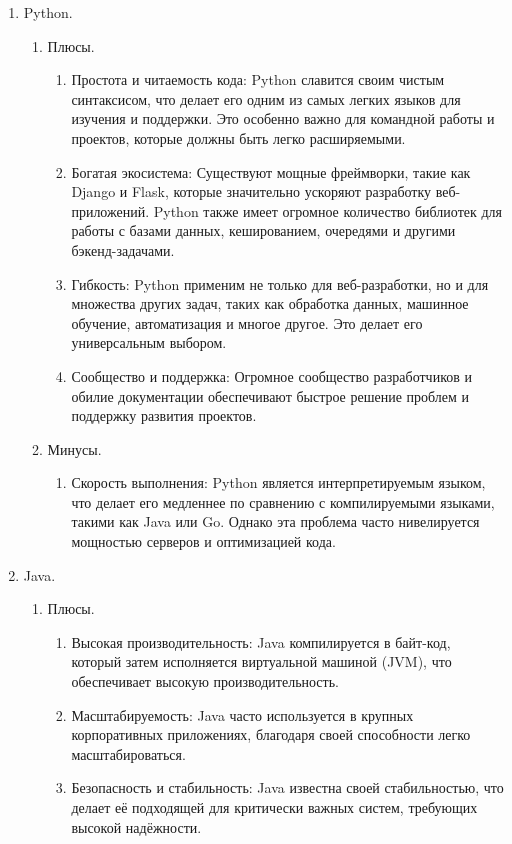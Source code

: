 \begin{enumerate}
	\item Python.
	\begin{enumerate}
		\item Плюсы.
		\begin{enumerate}
			\item Простота и читаемость кода: Python славится своим чистым синтаксисом, что делает его одним из самых легких языков для изучения и поддержки. Это особенно важно для командной работы и проектов, которые должны быть легко расширяемыми.
			\item Богатая экосистема: Существуют мощные фреймворки, такие как Django и Flask, которые значительно ускоряют разработку веб-приложений. Python также имеет огромное количество библиотек для работы с базами данных, кешированием, очередями и другими бэкенд-задачами.
			\item Гибкость: Python применим не только для веб-разработки, но и для множества других задач, таких как обработка данных, машинное обучение, автоматизация и многое другое. Это делает его универсальным выбором.
			\item Сообщество и поддержка: Огромное сообщество разработчиков и обилие документации обеспечивают быстрое решение проблем и поддержку развития проектов.
		\end{enumerate}

		\item Минусы.
		\begin{enumerate}
			\item Скорость выполнения: Python является интерпретируемым языком, что делает его медленнее по сравнению с компилируемыми языками, такими как Java или Go. Однако эта проблема часто нивелируется мощностью серверов и оптимизацией кода.
		\end{enumerate}
	\end{enumerate}

	\item Java.
	\begin{enumerate}
		\item Плюсы.
		\begin{enumerate}
			\item Высокая производительность: Java компилируется в байт-код, который затем исполняется виртуальной машиной (JVM), что обеспечивает высокую производительность.
			\item Масштабируемость: Java часто используется в крупных корпоративных приложениях, благодаря своей способности легко масштабироваться.
			\item Безопасность и стабильность: Java известна своей стабильностью, что делает её подходящей для критически важных систем, требующих высокой надёжности.
		\end{enumerate}


\end{enumerate}
\end{enumerate}
